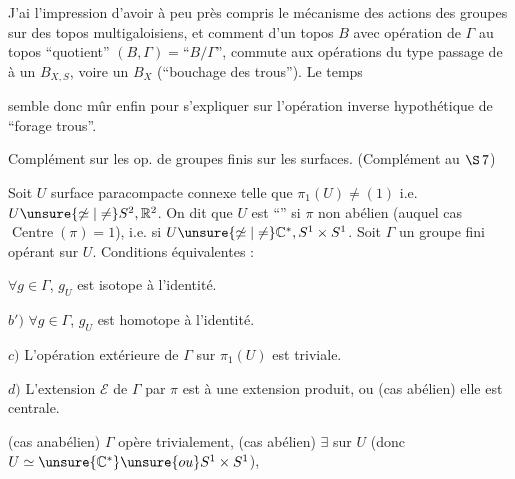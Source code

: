 J'ai l'impression d'avoir à peu près
compris le mécanisme des actions des
groupes sur des topos multigaloisiens,
et comment 
d'un topos $B$ avec opération de $\Gamma$
au topos ``quotient'' $(B,\Gamma)=\text{``}B/\Gamma\text{''}$,
commute aux opérations du type
passage de
à un $B_{X,S}$, voire un
$B_X$ (``bouchage des trous'').  Le temps


semble donc mûr enfin pour s'expliquer
sur l'opération inverse hypothétique
de ``forage  trous''.

 Complément sur les op. de groupes finis
sur les surfaces. (Complément au $\S\,7$)

Soit $U$ surface paracompacte connexe \unsure{!}
telle que $\pi_1(U)\ne(1)$ i.e. $U\unsure{\not\simeq|\ne}S^2,\mathbb R^2$.
On dit que $U$ est ``'' si
$\pi$ non abélien (auquel cas $\operatorname{Centre}(\pi)=1$),
i.e. si $U\unsure{\not\simeq|\ne}\mathbb C^*,S^1\times S^1$.
Soit $\Gamma$
un groupe fini opérant sur $U$. Conditions
équivalentes :

  $\forall g\in\Gamma$, $g_U$ est isotope à l'identité.

$b')$ $\forall g\in\Gamma$, $g_U$ est homotope à l'identité.

$c)$ L'opération extérieure de $\Gamma$ sur
$\pi_1(U)$ est triviale.

$d)$  L'extension $\mathcal E$ de $\Gamma$ par $\pi$ est
 à une extension produit, ou (cas abélien)
 elle est centrale.

 (cas anabélien) $\Gamma$ opère trivialement,
(cas abélien) $\exists$ 
sur $U$ (donc $U\simeq\unsure{\mathbb C^*} \unsure{ou} S^1\times S^1$),
\deleted{[de façon plus intrinsèque $U=(\pi\otimes_{\mathbb Z}\unsure{\mathbb C})/\pi$
\illegible{4}]}

